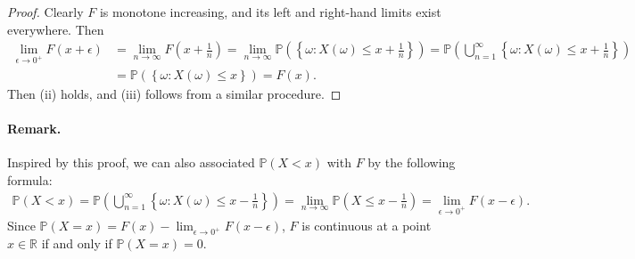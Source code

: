 \documentclass{article}
\numberwithin{equation}{section}
\renewcommand{\P}{\mathbb{P}}
\theoremstyle{plain}
\theoremstyle{definition}
\begin{document}
\begin{proof}
Clearly $F$ is monotone increasing, and its left and right-hand limits exist everywhere. Then
\begin{align*}
	\lim_{\epsilon\to 0^+}F(x+\epsilon) &= \lim_{n\to\infty}F\left(x+\frac{1}{n}\right) = \lim_{n\to\infty}\mathbb{P}\left(\left\{\omega:X(\omega)\leq x+\frac{1}{n}\right\}\right) = \mathbb{P}\left(\bigcup_{n=1}^\infty\left\{\omega:X(\omega)\leq x+\frac{1}{n}\right\}\right)\\
	&= \mathbb{P}\left(\left\{\omega:X(\omega)\leq x\right\}\right) = F(x). 
\end{align*}
Then (ii) holds, and (iii) follows from a similar procedure.
\end{proof}

\paragraph{Remark.} Inspired by this proof, we can also associated $\mathbb{P}(X<x)$ with $F$ by the following formula:
\begin{align*}
	\mathbb{P}(X<x) = \mathbb{P}\left(\bigcup_{n=1}^\infty\left\{\omega:X(\omega)\leq x-\frac{1}{n}\right\}\right) = \lim_{n\to\infty}\mathbb{P}\left(X\leq x-\frac{1}{n}\right) = \lim_{\epsilon\to 0^+}F(x-\epsilon).
\end{align*}
Since $\P(X=x)=F(x)-\lim_{\epsilon\to 0^+} F(x-\epsilon)$, $F$ is continuous at a point $x\in\mathbb{R}$ if and only if $\P(X=x)=0$.
\end{document}
